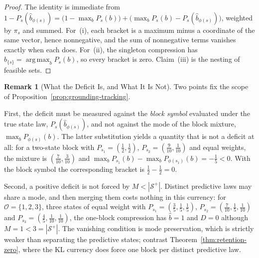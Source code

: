 \documentclass[12pt]{article}
\theoremstyle{definition}
\newtheorem{remark}[theorem]{Remark}
\DeclareMathOperator*{\argmax}{arg\,max}
\newcommand{\Splus}{\mathcal S^{+}}
\begin{document}
\begin{proof}
The identity is immediate from
$1-P_s(\hat b_{\phi(s)})=\bigl(1-\max_bP_s(b)\bigr)+\bigl(\max_bP_s(b)-P_s(\hat b_{\phi(s)})\bigr)$,
weighted by $\pi_s$ and summed.  For~(i), each bracket is a maximum minus a
coordinate of the same vector, hence nonnegative, and the sum of nonnegative
terms vanishes exactly when each does.  For~(ii), the singleton compression has
$\hat b_{\{s\}}=\argmax_bP_s(b)$, so every bracket is zero.  Claim~(iii) is the
nesting of feasible sets.
\end{proof}

\begin{remark}[What the Deficit Is, and What It Is Not]
\label{rem:tracking-deficit-scope}
Two points fix the scope of Proposition~\ref{prop:grounding-tracking}.

First, the deficit must be measured against the \emph{block symbol} evaluated
under the true state law, $P_s(\hat b_{\phi(s)})$, and not against the mode of
the block mixture, $\max_bP_{\phi(s)}(b)$.  The latter substitution yields a
quantity that is not a deficit at all: for a two-state block with
$P_{s_1}=(\tfrac12,\tfrac12)$, $P_{s_2}=(\tfrac9{10},\tfrac1{10})$ and equal
weights, the mixture is $(\tfrac7{10},\tfrac3{10})$ and
$\max_bP_{s_1}(b)-\max_bP_{\phi(s_1)}(b)=-\tfrac15<0$.  With the block symbol
the corresponding bracket is $\tfrac12-\tfrac12=0$.

Second, a positive deficit is not forced by $M<|\Splus|$.  Distinct predictive
laws may share a mode, and then merging them costs nothing in this currency:
for $\mathcal O=\{1,2,3\}$, three states of equal weight with
$P_{s_1}=(\tfrac35,\tfrac15,\tfrac15)$,
$P_{s_2}=(\tfrac7{10},\tfrac15,\tfrac1{10})$ and
$P_{s_3}=(\tfrac45,\tfrac1{10},\tfrac1{10})$, the one-block compression has
$\hat b=1$ and $D=0$ although $M=1<3=|\Splus|$.  The vanishing condition is
mode preservation, which is strictly weaker than separating the predictive
states; contrast Theorem~\ref{thm:retention-zero}, where the KL currency does
force one block per distinct predictive law.
\end{remark}
\end{document}
